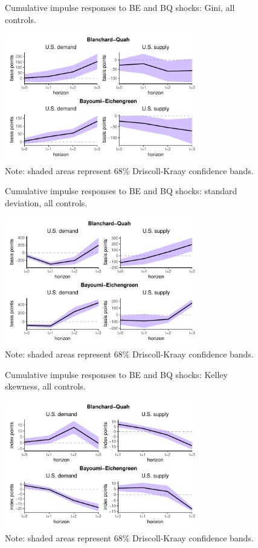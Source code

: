 \documentclass[12pt, a4paper]{article}
\begin{document}
\begin{figure}[H]
    \centering    
    \caption{Cumulative impulse responses to BE and BQ shocks: Gini, all controls.}  
    \label{fig:bqbe_gini}
    \includegraphics[width=0.75\textwidth]{Figures/robust_BQBE_demand_supply_LP.pdf}
    \centering \caption*{Note: shaded areas represent 68\% Driscoll-Kraay confidence bands.}
\end{figure}
\begin{figure}[H]
    \centering    
    \caption{Cumulative impulse responses to BE and BQ shocks: standard deviation, all controls.}  
    \label{fig:bqbe_std}
    \includegraphics[width=0.75\textwidth]{Figures/robust_std_BQBE_demand_supply_LP.pdf}
    \centering \caption*{Note: shaded areas represent 68\% Driscoll-Kraay confidence bands.}
\end{figure}
\begin{figure}[H]
    \centering    
    \caption{Cumulative impulse responses to BE and BQ shocks: Kelley skewness, all controls.}  
    \label{fig:bqbe_kelley}
    \includegraphics[width=0.75\textwidth]{Figures/robust_kelley_BQBE_demand_supply_LP.pdf}
    \centering \caption*{Note: shaded areas represent 68\% Driscoll-Kraay confidence bands.}
\end{figure}
\end{document}
